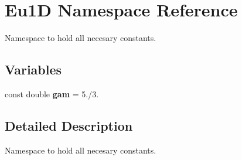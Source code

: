 \hypertarget{namespace_eu1_d}{\section{Eu1\-D Namespace Reference}
\label{namespace_eu1_d}
}


Namespace to hold all necesary constants.  


\subsection*{Variables}
\begin{DoxyCompactItemize}
\item 
\hypertarget{namespace_eu1_d_a11c0e40fc3c8e0bfa0fdddf6ff676661}{const double {\bfseries gam} = 5./3.}\label{namespace_eu1_d_a11c0e40fc3c8e0bfa0fdddf6ff676661}

\end{DoxyCompactItemize}


\subsection{Detailed Description}
Namespace to hold all necesary constants. 